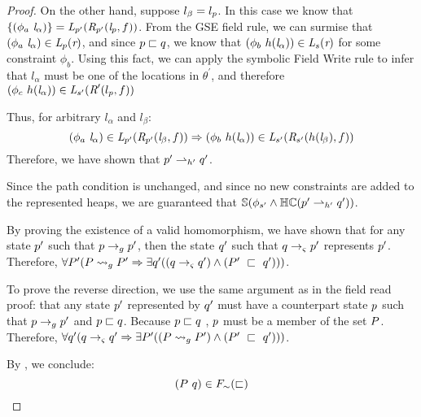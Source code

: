 \begin{proof}
On the other hand, suppose $l_\beta = l_{p}$. In this case we know that $\{(\phi_a\ \emph{l}_\alpha)\} = \emph{L}_{p^\prime}(\emph{R}_{p^\prime}(\emph{l}_{p},f ))$. From the GSE field rule, we can surmise that $(\phi_a\ \emph{l}_\alpha) \in \emph{L}_{p}(\emph{r} )$, and since $p \sqsubset q$, we know that $(\phi_b\ h(\emph{l}_\alpha)) \in \emph{L}_{s}(\emph{r})$ for some constraint $\phi_b$. Using this fact, we can apply the symbolic Field Write rule to infer that $l_\alpha$ must be one of the locations in $\theta^\prime$, and therefore $(\phi_c\ h(\emph{l}_\alpha)) \in \emph{L}_{s^\prime}(\emph{R}^\prime(l_{p},f))$

Thus, for arbitrary $l_\alpha$ and $l_\beta$:
$$(\phi_a\ \emph{l}_\alpha) \in \emph{L}_{p^\prime}(\emph{R}_{p^\prime}(\emph{l}_\beta,f )) \Rightarrow (\phi_b\ h(\emph{l}_\alpha))\in \emph{L}_{s^\prime}(\emph{R}_{s^\prime} (h(\emph{l}_\beta),f ))$$
Therefore, we have shown that $p^\prime \rightharpoonup_{h^\prime} q^\prime$.

Since the path condition is unchanged, and since no new constraints are added to the represented heaps, we are guaranteed that $\mathbb{S}(\phi_{s^\prime} \wedge \mathbb{HC}(p^\prime \rightharpoonup_{h^\prime} q^\prime) )$.

By proving the existence of a valid homomorphism, we have shown that for any state $p^\prime$ such that $p \rightarrow_{g} p^\prime$, then the state $q^\prime$ such that $q \rightarrow_{\varsigma} p^\prime$ represents $p^\prime$. Therefore, $\forall P^\prime ( P \leadsto_{g} P^\prime \Rightarrow \exists q^\prime( (q \rightarrow_{\varsigma} q^\prime )\wedge (P^\prime\ \sqsubset\ q^\prime ))  )$.

To prove the reverse direction, we use the same argument as in the field read proof: that any state $p^\prime$ represented by $q^\prime$ must have a counterpart state $p$ such that $p \rightarrow_{g} p^\prime$ and $p \sqsubset q$. Because $p \sqsubset q$ , $p$ must be a member of the set $P$. Therefore, $\forall q^\prime ( q \rightarrow_{\varsigma} q^\prime\Rightarrow \exists P^\prime( (P \leadsto_{g} P^\prime )\wedge (P^\prime\ \sqsubset\ q^\prime ))  )$.

By , we conclude:
$$(P \ q) \in F_\sim(\sqsubset)$$

\end{proof}


